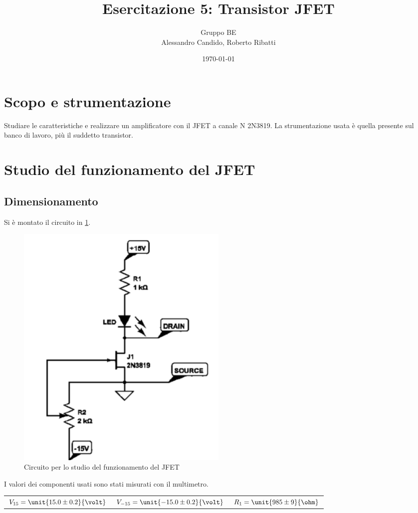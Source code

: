 \documentclass[10pt,a4paper]{article}
\title{Esercitazione 5: Transistor JFET}
\author{Gruppo BE \\ Alessandro Candido, Roberto Ribatti}
\date{\today}
\begin{document}
\maketitle

\section{Scopo e strumentazione}
Studiare le caratteristiche e realizzare un amplificatore con il JFET a canale N 2N3819.
La strumentazione usata è quella presente sul banco di lavoro, più il suddetto transistor.

\section{Studio del funzionamento del JFET}

\subsection{Dimensionamento}
Si è montato il circuito in \figurename{\ref{fig:circuito1}}.

\begin{figure}[h!]
	\centering
	\includegraphics[width=0.5\textwidth]{../grafici/Circuito1.png}
	\caption{Circuito per lo studio del funzionamento del JFET}
	\label{fig:circuito1}
\end{figure}

I valori dei componenti usati sono stati misurati con il multimetro.

\begin{table}[h!]
	\centering
	\begin{tabular}{ccc}
		$V_{15} = \unit{15.0 \pm 0.2}{\volt}$  & $V_{-15} = \unit{-15.0 \pm 0.2}{\volt}$ & $R_1 = \unit{985 \pm 9}{\ohm}$
	\end{tabular}
\end{table}
\end{document}
